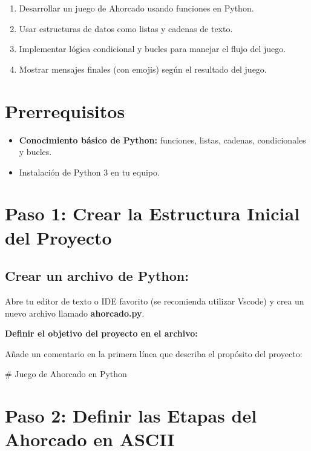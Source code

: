 \documentclass[
  a4paper,
  DIV=11,
  numbers=noendperiod,
  onepage,
  openany]{scrreprt}
\newenvironment{Shaded}{\begin{snugshade}}{\end{snugshade}}
\newcommand{\CommentTok}[1]{\textcolor[rgb]{0.37,0.37,0.37}{#1}}
\providecommand{\tightlist}{%
  \setlength{\itemsep}{0pt}\setlength{\parskip}{0pt}}\usepackage{longtable,booktabs,array}
\begin{document}
\begin{enumerate}
\def\labelenumi{\arabic{enumi}.}
\tightlist
\item
  Desarrollar un juego de Ahorcado usando funciones en Python.
\item
  Usar estructuras de datos como listas y cadenas de texto.
\item
  Implementar lógica condicional y bucles para manejar el flujo del
  juego.
\item
  Mostrar mensajes finales (con emojis) según el resultado del juego.
\end{enumerate}

\section{Prerrequisitos}\label{prerrequisitos}

\begin{itemize}
\item
  \textbf{Conocimiento básico de Python:} funciones, listas, cadenas,
  condicionales y bucles.
\item
  Instalación de Python 3 en tu equipo.
\end{itemize}

\section{Paso 1: Crear la Estructura Inicial del
Proyecto}\label{paso-1-crear-la-estructura-inicial-del-proyecto}

\subsection{Crear un archivo de
Python:}\label{crear-un-archivo-de-python}

Abre tu editor de texto o IDE favorito (se recomienda utilizar Vscode) y
crea un nuevo archivo llamado \textbf{ahorcado.py}.

\textbf{Definir el objetivo del proyecto en el archivo:}

Añade un comentario en la primera línea que describa el propósito del
proyecto:

\begin{Shaded}
\begin{Highlighting}[]
\CommentTok{\# Juego de Ahorcado en Python}
\end{Highlighting}
\end{Shaded}

\section{Paso 2: Definir las Etapas del Ahorcado en
ASCII}\label{paso-2-definir-las-etapas-del-ahorcado-en-ascii}
\end{document}
